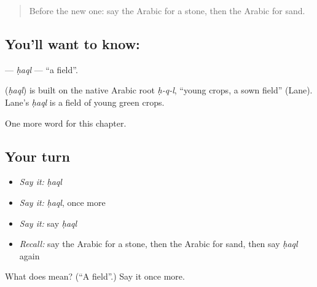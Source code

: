 \label{lesson:AR-C76-haql}



\begin{quote}
Before the new one: say the Arabic for a stone, then the Arabic for sand.
\end{quote}

\subsection*{You'll want to know: }
\textbf{} — \emph{ḥaql} — \textquotedblleft{}a field\textquotedblright{}.

\begin{cousinweb}
\textbf{} (\emph{ḥaql}) is built on the native Arabic root \emph{ḥ-q-l}, \textquotedblleft{}young crops, a sown field\textquotedblright{} (Lane). Lane's \emph{ḥaql} is a field of young green crops.
\end{cousinweb}

\begin{grammarlens}[title={What you've built}]
One more word for this chapter.
\end{grammarlens}

\subsection*{Your turn}
\begin{itemize}
\raggedright
  \item \emph{Say it:} \emph{ḥaql}
  \item \emph{Say it:} \emph{ḥaql}, once more
  \item \emph{Say it:} say \emph{ḥaql}
  \item \emph{Recall:} say the Arabic for a stone, then the Arabic for sand, then say \emph{ḥaql} again
\end{itemize}

\begin{tcolorbox}[breakable,colback=teal!4,colframe=teal!35!black,title={Before you move on}]
What does  mean? (\textquotedblleft{}A field\textquotedblright{}.) Say it once more.
\end{tcolorbox}
